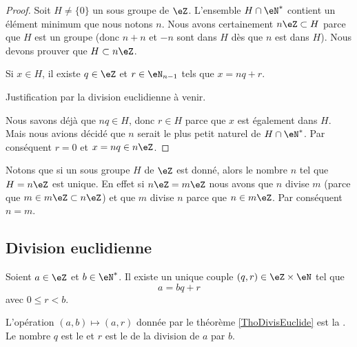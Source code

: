 \begin{proof}
    Soit \( H\neq\{ 0 \}\) un sous groupe de \( \eZ\). L'ensemble \( H\cap\eN^*\) contient un élément minimum que nous notons \( n\). Nous avons certainement \( n\eZ\subset H\) parce que \( H\) est un groupe (donc \( n+n\) et \( -n\) sont dans \( H\) dès que \( n\) est dans \( H\)). Nous devons prouver que \( H\subset n\eZ\).

    Si \( x\in H\), il existe \( q\in\eZ\) et \( r\in\eN_{n-1}\) tels que \( x=nq+r\).

    \begin{probleme}
        Justification par la division euclidienne à venir.
    \end{probleme}
    Nous savons déjà que \( nq\in H\), donc \( r\in H\) parce que \( x\) est également dans \( H\). Mais nous avions décidé que \( n\) serait le plus petit naturel de \( H\cap\eN^*\). Par conséquent \( r=0\) et \( x=nq\in n\eZ\).

\end{proof}

Notons que si un sous groupe \( H\) de \( \eZ\) est donné, alors le nombre \( n\) tel que \( H=n\eZ\) est unique. En effet si \( n\eZ=m\eZ\) nous avons que \( n\) divise \( m\) (parce que \( m\in m\eZ\subset n\eZ\)) et que \( m\) divise \( n\) parce que \( n\in m\eZ\). Par conséquent \( n=m\).

\subsection{Division euclidienne}

\begin{theorem}     \label{ThoDivisEuclide}
    Soient \( a\in\eZ\) et \( b\in\eN^*\). Il existe un unique couple \( (q,r)\in\eZ\times\eN\) tel que
    \begin{equation}
        a=bq+r
    \end{equation}
    avec \( 0\leq r<b\).
\end{theorem}

L'opération \( (a,b)\mapsto(a,r)\) donnée par le théorème \ref{ThoDivisEuclide} est la . Le nombre \( q\) est le  et \( r\) est le  de la division de \( a\) par \( b\).

